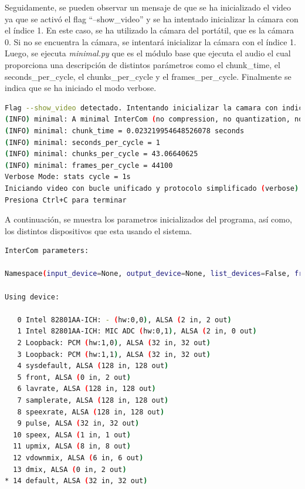 Seguidamente, se pueden observar un mensaje de que se ha inicializado el video ya que se activó el flag ``--show\_video'' y se ha intentado inicializar la cámara con el índice 1. En este caso, se ha utilizado la cámara del portátil, que es la cámara 0. Si no se encuentra la cámara, se intentará inicializar la cámara con el índice 1. Luego, se ejecuta \textit{minimal.py} que es el módulo base que ejecuta el audio el cual proporciona una descripción de distintos parámetros como el chunk\_time, el seconds\_per\_cycle, el chunks\_per\_cycle y el frames\_per\_cycle. Finalmente se indica que se ha iniciado el modo verbose.
\begin{lstlisting}[language=bash,basicstyle=\ttfamily\scriptsize]
Flag --show_video detectado. Intentando inicializar la camara con indice 1...
(INFO) minimal: A minimal InterCom (no compression, no quantization, no transform, ... only provides a bidirectional (full-duplex) transmission of raw (playable) chunks. 
(INFO) minimal: chunk_time = 0.023219954648526078 seconds
(INFO) minimal: seconds_per_cycle = 1
(INFO) minimal: chunks_per_cycle = 43.06640625
(INFO) minimal: frames_per_cycle = 44100
Verbose Mode: stats cycle = 1s
Iniciando video con bucle unificado y protocolo simplificado (verbose)...
Presiona Ctrl+C para terminar
\end{lstlisting}

A continuación, se muestra los parametros inicializados del programa, así como, los distintos dispositivos que esta usando el sistema.
\begin{lstlisting}[language=bash,basicstyle=\ttfamily\scriptsize]
InterCom parameters:

Namespace(input_device=None, output_device=None, list_devices=False, frames_per_second=44100, frames_per_chunk=1024, listening_port=4444, destination_address='localhost', destination_port=4444, filename=None, reading_time=None, number_of_channels=2, show_stats=True, show_samples=False, show_spectrum=False, video_payload_size=1400, width=320, height=240, fps=30, show_video=True, listening_video_port=4445, destination_video_port=4445, camera_index=1)

Using device:

   0 Intel 82801AA-ICH: - (hw:0,0), ALSA (2 in, 2 out)
   1 Intel 82801AA-ICH: MIC ADC (hw:0,1), ALSA (2 in, 0 out)
   2 Loopback: PCM (hw:1,0), ALSA (32 in, 32 out)
   3 Loopback: PCM (hw:1,1), ALSA (32 in, 32 out)
   4 sysdefault, ALSA (128 in, 128 out)
   5 front, ALSA (0 in, 2 out)
   6 lavrate, ALSA (128 in, 128 out)
   7 samplerate, ALSA (128 in, 128 out)
   8 speexrate, ALSA (128 in, 128 out)
   9 pulse, ALSA (32 in, 32 out)
  10 speex, ALSA (1 in, 1 out)
  11 upmix, ALSA (8 in, 8 out)
  12 vdownmix, ALSA (6 in, 6 out)
  13 dmix, ALSA (0 in, 2 out)
* 14 default, ALSA (32 in, 32 out)
\end{lstlisting}

